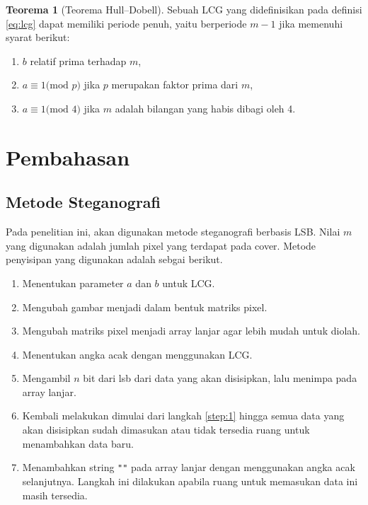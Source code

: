 \documentclass[10pt,conference]{IEEEtran}
\theoremstyle{definition}
\newtheorem{theorem}{Teorema}[section]
\begin{document}
\begin{theorem}[Teorema Hull–Dobell] \label{theo:hulldobell}
    Sebuah LCG yang didefinisikan pada definisi \ref{eq:lcg} dapat memiliki periode penuh, yaitu berperiode $m-1$ jika memenuhi syarat berikut:
    \begin{enumerate}
        \item $b$ relatif prima terhadap $m$,
        \item $a \equiv 1 \text{(mod }p\text{)}$ jika $p$ merupakan faktor prima dari $m$,
        \item $a \equiv 1 \text{(mod }4\text{)}$ jika $m$ adalah bilangan yang habis dibagi oleh 4.
    \end{enumerate}
\end{theorem}

\section{Pembahasan}
\subsection{Metode Steganografi}
Pada penelitian ini, akan digunakan metode steganografi berbasis LSB. Nilai $m$ yang digunakan adalah jumlah pixel yang terdapat pada cover. Metode penyisipan yang digunakan adalah sebgai berikut.
\begin{enumerate}
    \item Menentukan parameter $a$ dan $b$ untuk LCG.
    \item Mengubah gambar menjadi dalam bentuk matriks pixel.
    \item Mengubah matriks pixel menjadi array lanjar agar lebih mudah untuk diolah.
    \item \label{step:1} Menentukan angka acak dengan menggunakan LCG.
    \item Mengambil $n$ bit dari lsb dari data yang akan disisipkan, lalu menimpa pada array lanjar. 
    \item Kembali melakukan dimulai dari langkah \ref{step:1} hingga semua data yang akan disisipkan sudah dimasukan atau tidak tersedia ruang untuk menambahkan data baru.
    \item Menambahkan string \texttt{""} pada array lanjar dengan menggunakan angka acak selanjutnya. Langkah ini dilakukan apabila ruang untuk memasukan data ini masih tersedia.
\end{enumerate}
\end{document}
